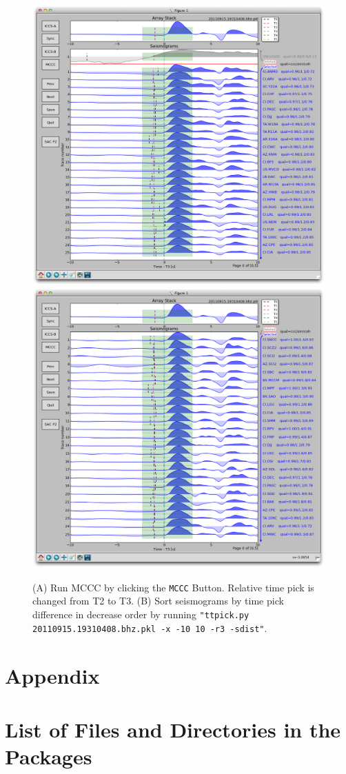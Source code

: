 \documentclass[12pt, titlepage]{article}
\begin{document}
\begin{figure}[!h]
    \centering
    \vspace{3em}
    \includegraphics[width = 0.494 \textwidth]{figs/snapshots/ttpick-r3-s0.png}
    \includegraphics[width = 0.494 \textwidth]{figs/snapshots/ttpick-r3-sdist.png}
    \caption{
    (A) Run MCCC by clicking the \texttt{MCCC} Button. Relative time pick is changed from T2 to T3.
    (B) Sort seismograms by time pick difference in decrease order by running \texttt{"ttpick.py 20110915.19310408.bhz.pkl -x -10 10 -r3 -sdist"}.
    }
    \label{fig:ttpick4}
\end{figure}


\newpage

\section{Appendix}


\appendix
\section{List of Files and Directories in the Packages}
\end{document}
